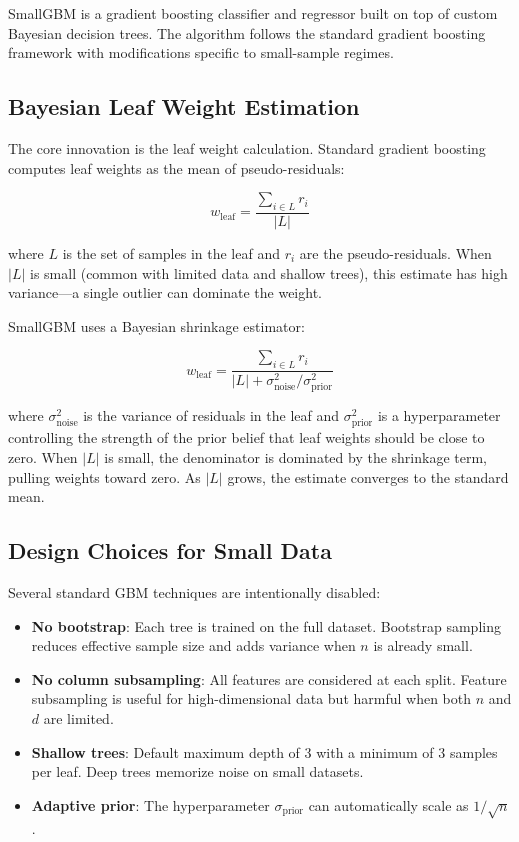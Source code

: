 \documentclass{article}
\begin{document}
SmallGBM is a gradient boosting classifier and regressor built on top of custom Bayesian decision trees. The algorithm follows the standard gradient boosting framework \cite{friedman2001greedy} with modifications specific to small-sample regimes.

\subsection{Bayesian Leaf Weight Estimation}
The core innovation is the leaf weight calculation. Standard gradient boosting computes leaf weights as the mean of pseudo-residuals:

\begin{equation}
w_{\text{leaf}} = \frac{\sum_{i \in L} r_i}{|L|}
\end{equation}

where $L$ is the set of samples in the leaf and $r_i$ are the pseudo-residuals. When $|L|$ is small (common with limited data and shallow trees), this estimate has high variance---a single outlier can dominate the weight.

SmallGBM uses a Bayesian shrinkage estimator:

\begin{equation}
w_{\text{leaf}} = \frac{\sum_{i \in L} r_i}{|L| + \sigma^2_{\text{noise}} / \sigma^2_{\text{prior}}}
\end{equation}

where $\sigma^2_{\text{noise}}$ is the variance of residuals in the leaf and $\sigma^2_{\text{prior}}$ is a hyperparameter controlling the strength of the prior belief that leaf weights should be close to zero. When $|L|$ is small, the denominator is dominated by the shrinkage term, pulling weights toward zero. As $|L|$ grows, the estimate converges to the standard mean.

\subsection{Design Choices for Small Data}
Several standard GBM techniques are intentionally disabled:

\begin{itemize}
    \item \textbf{No bootstrap}: Each tree is trained on the full dataset. Bootstrap sampling reduces effective sample size and adds variance when $n$ is already small.
    \item \textbf{No column subsampling}: All features are considered at each split. Feature subsampling is useful for high-dimensional data but harmful when both $n$ and $d$ are limited.
    \item \textbf{Shallow trees}: Default maximum depth of 3 with a minimum of 3 samples per leaf. Deep trees memorize noise on small datasets.
    \item \textbf{Adaptive prior}: The hyperparameter $\sigma_{\text{prior}}$ can automatically scale as $1/\sqrt{n}$.
\end{itemize}
\end{document}
